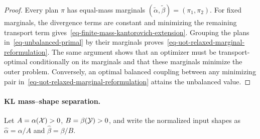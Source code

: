 \begin{proof}
Every plan $\pi$ has equal-mass marginals $(\widetilde\alpha,\widetilde\beta)=(\pi_1,\pi_2)$. For fixed marginals, the divergence terms are constant and minimizing the remaining transport term gives~\eqref{eq-finite-mass-kantorovich-extension}. Grouping the plans in~\eqref{eq-unbalanced-primal} by their marginals proves~\eqref{eq-uot-relaxed-marginal-reformulation}. The same argument shows that an optimizer must be transport-optimal conditionally on its marginals and that these marginals minimize the outer problem. Conversely, an optimal balanced coupling between any minimizing pair in~\eqref{eq-uot-relaxed-marginal-reformulation} attains the unbalanced value.
\end{proof}
\paragraph{KL mass--shape separation.}
Let $A=\alpha(\mathcal{X})>0$, $B=\beta(\mathcal{Y})>0$, and write the normalized input shapes as $\widehat\alpha=\alpha/A$ and $\widehat\beta=\beta/B$.

